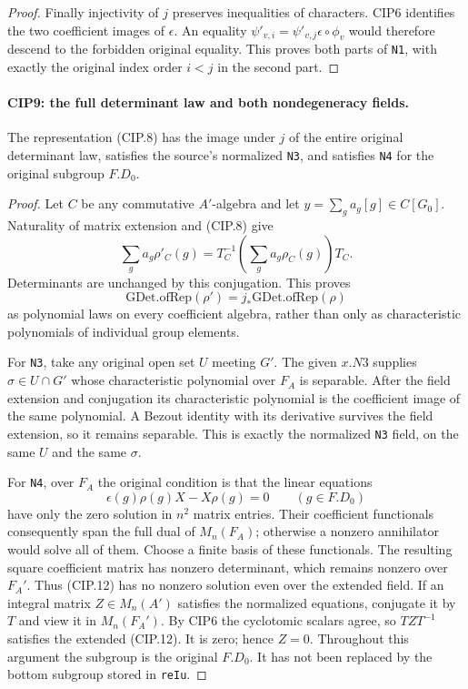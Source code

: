 \begin{proof}
Finally injectivity of $j$ preserves inequalities of characters.
CIP6 identifies the two coefficient images of $\epsilon$.
An equality $\psi'_{v,i}=\psi'_{v,j}\epsilon\circ\phi_v$
would therefore descend to the forbidden original equality.
This proves both parts of \texttt{N1}, with exactly the original
index order $i<j$ in the second part.
\end{proof}

\paragraph{CIP9: the full determinant law and both nondegeneracy fields.}
\label{claim:CIP9}
The representation (CIP.8) has the image under $j$ of the entire
original determinant law, satisfies the source's normalized
\texttt{N3}, and satisfies \texttt{N4} for the original subgroup
$F.D_0$.
\begin{proof}
Let $C$ be any commutative $A'$-algebra and let
$y=\sum_g a_g[g]\in C[G_0]$.  Naturality of matrix extension and
(CIP.8) give
\[
 \sum_g a_g\rho'_C(g)
       =T_C^{-1}\left(\sum_g a_g\rho_C(g)\right)T_C.
\]
Determinants are unchanged by this conjugation.  This proves
\[
 \mathrm{GDet.ofRep}(\rho')
             =j_*\mathrm{GDet.ofRep}(\rho)           \tag{CIP.11}
\]
as polynomial laws on every coefficient algebra, rather than only
as characteristic polynomials of individual group elements.

For \texttt{N3}, take any original open set $U$ meeting $G'$.
The given $x.N3$ supplies $\sigma\in U\cap G'$ whose characteristic
polynomial over $F_A$ is separable.  After the field extension and
conjugation its characteristic polynomial is the coefficient image
of the same polynomial.  A Bezout identity with its derivative
survives the field extension, so it remains separable.  This is
exactly the normalized \texttt{N3} field, on the same $U$ and
the same $\sigma$.

For \texttt{N4}, over $F_A$ the original condition is that the
linear equations
\[
 \epsilon(g)\rho(g)X-X\rho(g)=0
                      \qquad(g\in F.D_0)            \tag{CIP.12}
\]
have only the zero solution in $n^2$ matrix entries.  Their
coefficient functionals consequently span the full dual of
$M_n(F_A)$; otherwise a nonzero annihilator would solve all of
them.  Choose a finite basis of these functionals.  The resulting
square coefficient matrix has nonzero determinant, which remains
nonzero over $F_A'$.  Thus (CIP.12) has no nonzero solution even
over the extended field.  If an integral matrix $Z\in M_n(A')$
satisfies the normalized equations, conjugate it by $T$ and view
it in $M_n(F_A')$.  By CIP6 the cyclotomic scalars agree, so
$TZT^{-1}$ satisfies the extended (CIP.12).  It is zero; hence
$Z=0$.  Throughout this argument the subgroup is the original
$F.D_0$.  It has not been replaced by the bottom subgroup stored
in \texttt{reIu}.
\end{proof}

